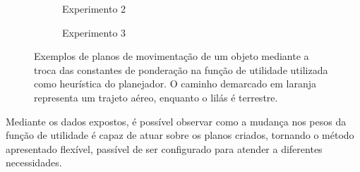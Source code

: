 \begin{figure}[htpb]
\begin{subfigure}[t]{0.315\textwidth}
    \caption{Experimento 2}
    \label{fig:utility_function_energy}
  \end{subfigure}
  \hspace{0.1cm}
  \begin{subfigure}[t]{0.315\textwidth}
    \centering
    \caption{Experimento 3}
    \label{fig:utility_function_mid}
  \end{subfigure}

  \caption[Exemplos de planos de movimentação de um objeto com diferentes pesos na função de utilidade]{Exemplos de planos de movimentação de um objeto mediante a troca das constantes de ponderação na função de utilidade utilizada como heurística do planejador. O caminho demarcado em laranja representa um trajeto aéreo, enquanto o lilás é terrestre.}
  \label{fig:utility_function_graph}

\end{figure}

Mediante os dados expostos, é possível observar como a mudança nos pesos da função de utilidade é capaz de atuar sobre os planos criados, tornando o método apresentado flexível, passível de ser configurado para atender a diferentes necessidades.

